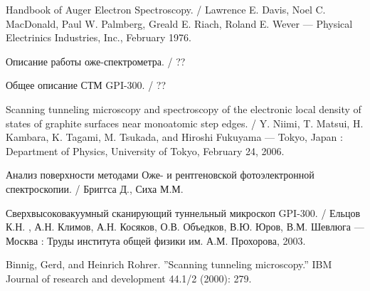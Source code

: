 \documentclass[a4paper, 12pt]{article}
\begin{document}
	\newpage
	
	\begin{thebibliography}{2}
		
		 Handbook of Auger Electron Spectroscopy. /  Lawrence E. Davis, Noel C. MacDonald, Paul W. Palmberg, Greald E. Riach, Roland E. Wever --- Physical Electrinics Industries, Inc., February 1976.
		
		 Описание работы оже-спектрометра. / ??
		
		 Общее описание СТМ GPI-300. / ??
		
		 Scanning tunneling microscopy and spectroscopy of the electronic local density of states of graphite surfaces near monoatomic step edges. / Y. Niimi, T. Matsui, H. Kambara, K. Tagami, M. Tsukada, and Hiroshi Fukuyama --- Tokyo, Japan : Department of Physics, University of Tokyo, February 24, 2006.
		
		 Анализ поверхности методами Оже- и рентгеновской фотоэлектронной спектроскопии. / Бриггса Д., Сиха М.М.
		
		 Сверхвысоковакуумный сканирующий туннельный микроскоп GPI-300. / Ельцов К.Н. , А.Н. Климов, А.Н. Косяков, О.В. Объедков, В.Ю. Юров, В.М. Шевлюга --- Москва : Труды института общей физики им. А.М. Прохорова, 2003.
		
		 Binnig, Gerd, and Heinrich Rohrer. ''Scanning tunneling microscopy.'' IBM Journal of research and development 44.1/2 (2000): 279.
		
	\end{thebibliography}
	
	
	\newpage
	
	
	
	
	
	
	
	

	

	
	
	
	
	
	
	
	
	
	
	
	
	
	
	
	
	
	
	
	
	
	
	
	
	
	
	
	
	
	
	
	
	
	
	
	
	
\end{document}
